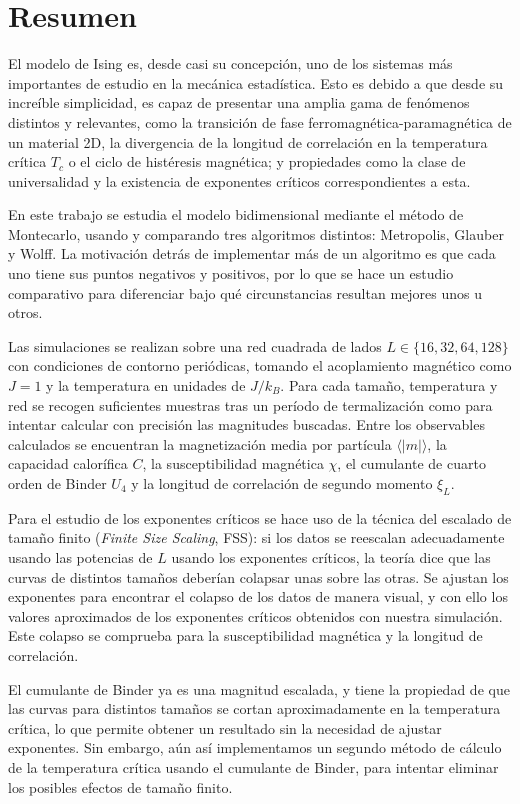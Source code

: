 \section*{Resumen}

El modelo de Ising es, desde casi su concepción, uno de los sistemas más importantes de estudio en la mecánica estadística. Esto es debido a que desde su increíble simplicidad, es capaz de presentar una amplia gama de fenómenos distintos y relevantes, como la transición de fase ferromagnética-paramagnética de un material 2D, la divergencia de la longitud de correlación en  la temperatura crítica $T_c$ o el ciclo de histéresis magnética; y propiedades como la clase de universalidad y la existencia de exponentes críticos correspondientes a esta.

En este trabajo se estudia el modelo bidimensional mediante el método de Montecarlo, usando y comparando tres algoritmos distintos: Metropolis, Glauber y Wolff. La motivación detrás de implementar más de un algoritmo es que cada uno tiene sus puntos negativos y positivos, por lo que se hace un estudio comparativo para diferenciar bajo qué circunstancias resultan mejores unos u otros.

Las simulaciones se realizan sobre una red cuadrada de lados $L\in \{16,32,64,128\} $ con condiciones de contorno periódicas, tomando el acoplamiento magnético como $J=1$ y la temperatura en unidades de $J/k_B$. Para cada tamaño, temperatura y red se recogen suficientes muestras tras un período de termalización como para intentar calcular con precisión las magnitudes buscadas. Entre los observables calculados se encuentran la magnetización media por partícula $\langle |m| \rangle$, la capacidad calorífica $C$, la susceptibilidad magnética $\chi$, el cumulante de cuarto orden de Binder $U_4$ y la longitud de correlación de segundo momento $\xi_L$. 

Para el estudio de los exponentes críticos se hace uso de la técnica del escalado de tamaño finito (\textit{Finite Size Scaling}, FSS): si los datos se reescalan adecuadamente usando las potencias de $L$ usando los exponentes críticos, la teoría dice que las curvas de distintos tamaños deberían colapsar unas sobre las otras. Se ajustan los exponentes para encontrar el colapso de los datos de manera visual, y con ello los valores aproximados de los exponentes críticos obtenidos con nuestra simulación. Este colapso se comprueba para la susceptibilidad magnética y la longitud de correlación.

El cumulante de Binder ya es una magnitud escalada, y tiene la propiedad de que las curvas para distintos tamaños se cortan aproximadamente en la temperatura crítica, lo que permite obtener un resultado sin la necesidad de ajustar exponentes. Sin embargo, aún así implementamos un segundo método de cálculo de la temperatura crítica usando el cumulante de Binder, para intentar eliminar los posibles efectos de tamaño finito.

